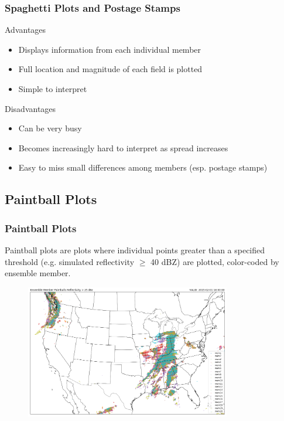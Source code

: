 \documentclass{beamer}
\begin{document}
\begin{frame}
\frametitle{Spaghetti Plots and Postage Stamps}
Advantages
\begin{itemize}
\item Displays information from each individual member
\item Full location and magnitude of each field is plotted
\item Simple to interpret 
\end{itemize}

Disadvantages
\begin{itemize}
  \item Can be very busy
  \item Becomes increasingly hard to interpret as spread increases
  \item Easy to miss small differences among members (esp. postage stamps)
\end{itemize}
\end{frame}

\subsection{Paintball Plots}
\begin{frame}
\frametitle{Paintball Plots}
Paintball plots are plots where individual points greater than a specified threshold (e.g. simulated reflectivity $\geq$ 40 dBZ) are plotted, color-coded by ensemble member.

\begin{figure}
    \includegraphics[width=0.8\textwidth]{paintballs}
\end{figure}
\end{frame}
\end{document}
